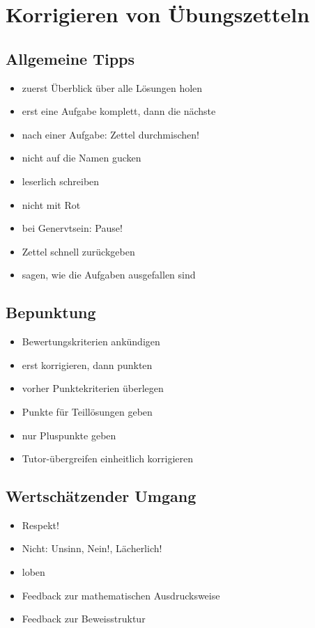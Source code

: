 \chapter{Korrigieren von Übungszetteln}


\section{Allgemeine Tipps}
\begin{itemize}
    \item zuerst Überblick über alle Lösungen holen
    \item erst eine Aufgabe komplett, dann die nächste
    \item nach einer Aufgabe: Zettel durchmischen!
    \item nicht auf die Namen gucken
    \item leserlich schreiben
    \item nicht mit Rot
    \item bei Genervtsein: Pause!
    \item Zettel schnell zurückgeben
    \item sagen, wie die Aufgaben ausgefallen sind
\end{itemize}


\section{Bepunktung}
\begin{itemize}
    \item Bewertungskriterien ankündigen
    \item erst korrigieren, dann punkten
    \item vorher Punktekriterien überlegen
    \item Punkte für Teillösungen geben
    \item nur Pluspunkte geben
    \item Tutor-übergreifen einheitlich korrigieren
\end{itemize}


\section{Wertschätzender Umgang}
\begin{itemize}
    \item Respekt!
    \item Nicht: \glqq Unsinn\grqq, \glqq Nein!\grqq, \glqq Lächerlich!\grqq
    \item loben
    \item Feedback zur mathematischen Ausdrucksweise
    \item Feedback zur Beweisstruktur
\end{itemize}
